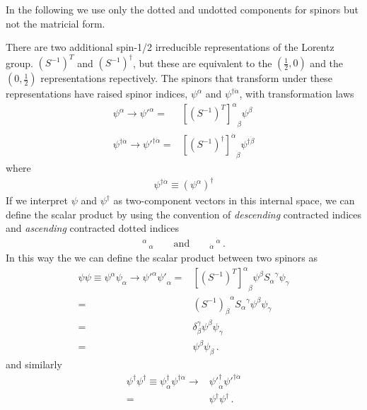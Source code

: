 In the following we use only the dotted and undotted components for
spinors but not the matricial form. 
\begin{frame}
There are two additional spin-1/2
irreducible representations of the Lorentz group. $\left( S^{-1}
\right)^T$ and $\left( S^{-1} \right)^{\dagger}$, but these are
equivalent to the $\left( \frac{1}{2},0 \right)$ and the $\left(
  0,\frac{1}{2}\right)$ representations repectively. The spinors that
  transform under these representations have raised spinor indices,
  $\psi^{\alpha}$ and $\psi^{\dagger\dot{\alpha}}$, with
  transformation laws
\begin{align}
  \psi^{\alpha}\to {\psi'}^{\alpha}=&{\left[ \left( S^{-1} \right)^T \right]^{\alpha}}_{\beta}\psi^{\beta}\nonumber\\
  \psi^{\dagger\dot{\alpha}}\to {\psi'}^{\dagger\dot{\alpha}}=&{\left[ \left( S^{-1} \right)^\dagger \right]^{\dot{\alpha}}}_{\dot{\beta}}\psi^{\dagger\dot{\beta}}
\end{align}
where
\begin{align}
  \psi^{\dagger\dot{\alpha}}\equiv \left( \psi^\alpha \right)^{\dagger}
\end{align}
If we interpret $\psi$ and $\psi^{\dagger}$ as two-component vectors in this internal space, we can define the scalar product by using the convention of \emph{descending} contracted indices and \emph{ascending} contracted dotted indices
\begin{align}
\label{eq:conven}
  {{}^{\alpha}}\,{}_{\alpha}\qquad \text{and}\qquad {{}_{\dot{\alpha}}}\,{}^{\dot{\alpha}}\,.
\end{align}
In this way the we can define the scalar product between two spinors as
\begin{align}
\psi\psi\equiv  \psi^{\alpha}\psi_{\alpha}\to {\psi'}^{\alpha}{\psi'}_{\alpha}=& {\left[ \left( S^{-1} \right)^T \right]^{\alpha}}_{\beta}\psi^{\beta} {S_\alpha}^\gamma\psi_\gamma \nonumber\\
 =& {\left( S^{-1} \right)_{\beta}}^{\alpha}{S_\alpha}^\gamma\psi^{\beta}\psi_\gamma \nonumber\\
  =& \delta_{\beta}^{\gamma}\psi^{\beta}\psi_\gamma \nonumber\\
  =& \psi^{\beta}\psi_\beta\,.
\end{align}
and similarly
\begin{align}
  \psi^{\dagger}\psi^{\dagger}\equiv {\psi}^{\dagger}_{\dot{\alpha}}{\psi}^{\dagger\dot{\alpha}}
\to &{\psi'}^{\dagger}_{\dot{\alpha}}{\psi'}^{\dagger\dot{\alpha}}\nonumber\\
=&\psi^{\dagger}\psi^{\dagger}\,.
\end{align}
\end{frame}
